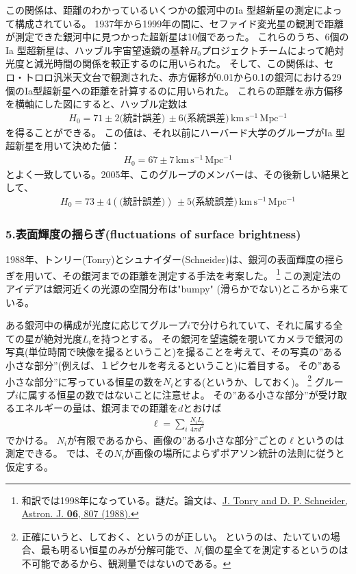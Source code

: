 \documentclass[11pt]{ltjsarticle}
\theoremstyle{plain}
\theoremstyle{break}
\begin{document}
この関係は、距離のわかっているいくつかの銀河中のIa 型超新星の測定によって構成されている。
1937年から1999年の間に、セファイド変光星の観測で距離が測定できた銀河中に見つかった超新星は10個であった。
これらのうち、6個のIa 型超新星は、ハッブル宇宙望遠鏡の基幹$H_0$プロジェクトチームによって絶対光度と減光時間の関係を較正するのに用いられた。
そして、この関係は、セロ・トロロ汎米天文台で観測された、赤方偏移が0.01から0.1の銀河における29個のIa型超新星への距離を計算するのに用いられた。
これらの距離を赤方偏移を横軸にした図にすると、ハッブル定数は
\begin{align}
  H_0 = 71 \pm 2 \text{(統計誤差)} \, \pm 6 \text{(系統誤差)} \, \mathrm{km\,s^{-1}\,Mpc^{-1}}
\end{align}
を得ることができる。
この値は、それ以前にハーバード大学のグループがIa 型超新星を用いて決めた値：
\begin{align}
  H_0 = 67 \pm 7 \, \mathrm{km\,s^{-1}\,Mpc^{-1}}
\end{align}
とよく一致している。2005年、このグループのメンバーは、その後新しい結果として、
\begin{align}
  H_0 = 73 \pm 4(\text{(統計誤差)}) \,\pm 5 \text{(系統誤差)} \, \mathrm{km \, s^{-1} \, Mpc^{-1}}
\end{align}


\subsubsection*{5.表面輝度の揺らぎ(fluctuations of surface brightness)}
1988年、トンリー(Tonry)とシュナイダー(Schneider)は、銀河の表面輝度の揺らぎを用いて、その銀河までの距離を測定する手法を考案した。
\footnote{和訳では1998年になっている。謎だ。論文は、\href{http://articles.adsabs.harvard.edu/cgi-bin/nph-iarticle_query?letter=.&classic=YES&bibcode=1988AJ.....96..807T&page=&type=SCREEN_VIEW&data_type=PDF_LOW&send=GET&filetype=.pdf }{J. Tonry and D. P. Schneider, Astron. J. \textbf{06}, 807 (1988).}}
この測定法のアイデアは銀河近くの光源の空間分布は"bumpy" (滑らかでない)ところから来ている。

ある銀河中の構成が光度に応じてグループ$i$で分けられていて、それに属する全ての星が絶対光度$L_i$を持つとする。
その銀河を望遠鏡を覗いてカメラで銀河の写真(単位時間で映像を撮るということ)を撮ることを考えて、その写真の”ある小さな部分”(例えば、１ピクセルを考えるということ)に着目する。
その”ある小さな部分”に写っている恒星の数を$N_i$とする(というか、しておく)。
\footnote{正確にいうと、しておく、というのが正しい。
というのは、たいていの場合、最も明るい恒星のみが分解可能で、$N_i$個の星全てを測定するというのは不可能であるから、観測量ではないのである。}
グループ$i$に属する恒星の数ではないことに注意せよ。
その”ある小さな部分”が受け取るエネルギーの量は、銀河までの距離を$d$とおけば
\begin{align}
  \ell=\sum_{i} \frac{N_{i} L_{i}}{4 \pi d^{2}}
\end{align}%
でかける。
$N_i$が有限であるから、画像の”ある小さな部分”ごとの$\ell$というのは測定できる。
では、その$N_i$が画像の場所によらずポアソン統計の法則に従うと仮定する。
\end{document}

